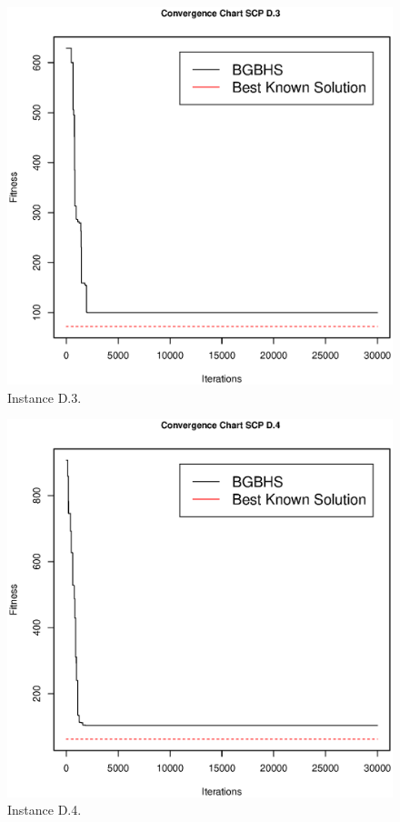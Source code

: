\begin{figure}[]
\centering
\includegraphics[scale=.45]{Resultados/scpD3.eps}
\caption{Instance D.3.}
\label{fig:Instance.D.3}
\end{figure}

\begin{figure}[]
\centering
\includegraphics[scale=.45]{Resultados/scpD4.eps}
\caption{Instance D.4.}
\label{fig:Instance.D.4}
\end{figure}


